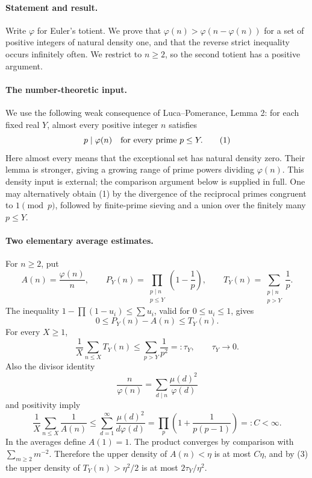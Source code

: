 \paragraph{Statement and result.}
Write \(\varphi\) for Euler's totient. We prove that
\(\varphi(n)>\varphi(n-\varphi(n))\) for a set of positive integers of natural density one, and that the reverse strict inequality occurs infinitely often. We restrict to \(n\geq2\), so the second totient has a positive argument.

\paragraph{The number-theoretic input.}
We use the following weak consequence of Luca--Pomerance, Lemma 2: for each fixed real \(Y\), almost every positive integer \(n\) satisfies
\[
 p\mid\varphi(n)\quad\hbox{for every prime }p\leq Y.
 \tag{1}
\]
Here almost every means that the exceptional set has natural density zero. Their lemma is stronger, giving a growing range of prime powers dividing \(\varphi(n)\). This density input is external; the comparison argument below is supplied in full. One may alternatively obtain (1) by the divergence of the reciprocal primes congruent to \(1\pmod p\), followed by finite-prime sieving and a union over the finitely many \(p\leq Y\).

\paragraph{Two elementary average estimates.}
For \(n\geq2\), put
\[
 A(n)=\frac{\varphi(n)}n,\qquad
 P_Y(n)=\prod_{\substack{p\mid n\\p\leq Y}}\left(1-\frac1p\right),
 \qquad
 T_Y(n)=\sum_{\substack{p\mid n\\p>Y}}\frac1p.
\]
The inequality \(1-\prod(1-u_i)\leq\sum u_i\), valid for \(0\leq u_i\leq1\), gives
\[
 0\leq P_Y(n)-A(n)\leq T_Y(n).
 \tag{2}
\]
For every \(X\geq1\),
\[
 \frac1X\sum_{n\leq X}T_Y(n)
 \leq\sum_{p>Y}\frac1{p^2}=:\tau_Y,
 \qquad \tau_Y\longrightarrow0.
 \tag{3}
\]
Also the divisor identity
\[
 \frac n{\varphi(n)}
 =\sum_{d\mid n}\frac{\mu(d)^2}{\varphi(d)}
\]
and positivity imply
\[
 \frac1X\sum_{n\leq X}\frac1{A(n)}
 \leq\sum_{d=1}^{\infty}\frac{\mu(d)^2}{d\varphi(d)}
 =\prod_p\left(1+\frac1{p(p-1)}\right)=:C<\infty.
 \tag{4}
\]
In the averages define \(A(1)=1\). The product converges by comparison with \(\sum_{m\geq2}m^{-2}\). Therefore the upper density of \(A(n)<\eta\) is at most \(C\eta\), and by (3) the upper density of \(T_Y(n)>\eta^2/2\) is at most \(2\tau_Y/\eta^2\).

